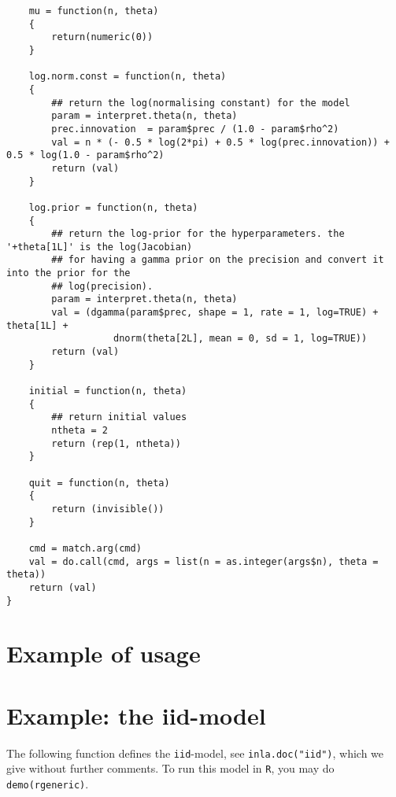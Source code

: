 \documentclass[a4paper,11pt]{article}
\begin{document}
{\begin{verbatim}
    mu = function(n, theta)
    {
        return(numeric(0))
    }

    log.norm.const = function(n, theta)
    {
        ## return the log(normalising constant) for the model
        param = interpret.theta(n, theta)
        prec.innovation  = param$prec / (1.0 - param$rho^2)
        val = n * (- 0.5 * log(2*pi) + 0.5 * log(prec.innovation)) + 0.5 * log(1.0 - param$rho^2)
        return (val)
    }

    log.prior = function(n, theta)
    {
        ## return the log-prior for the hyperparameters. the '+theta[1L]' is the log(Jacobian)
        ## for having a gamma prior on the precision and convert it into the prior for the
        ## log(precision).
        param = interpret.theta(n, theta)
        val = (dgamma(param$prec, shape = 1, rate = 1, log=TRUE) + theta[1L] + 
                   dnorm(theta[2L], mean = 0, sd = 1, log=TRUE))
        return (val)
    }

    initial = function(n, theta)
    {
        ## return initial values
        ntheta = 2
        return (rep(1, ntheta))
    }

    quit = function(n, theta)
    {
        return (invisible())
    }

    cmd = match.arg(cmd)
    val = do.call(cmd, args = list(n = as.integer(args$n), theta = theta))
    return (val)
}
\end{verbatim}
}

\section*{Example of usage}

{\small

}

\clearpage

\section*{Example: the iid-model}

The following function defines the \texttt{iid}-model, see
\texttt{inla.doc("iid")}, which we give without further comments. To
run this model in \texttt{R}, you may do \texttt{demo(rgeneric)}.
\end{document}
